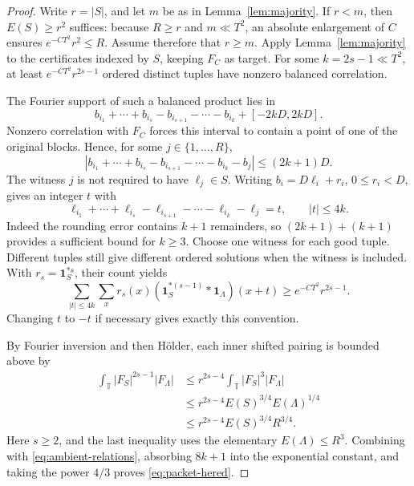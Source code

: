 \documentclass[11pt,reqno]{amsart}
\numberwithin{equation}{section}
\theoremstyle{definition}
\theoremstyle{remark}
\newcommand{\T}{\mathbb T}
\newcommand{\one}{\mathbf 1}
\begin{document}
\begin{proof}
Write $r=|S|$, and let $m$ be as in Lemma~\ref{lem:majority}. If $r<m$,
then $E(S)\ge r^2$ suffices: because $R\ge r$ and $m\ll T^2$, an
absolute enlargement of $C$ ensures $e^{-CT^2}r^2\le R$.
Assume therefore that $r\ge m$. Apply Lemma~\ref{lem:majority} to the
certificates indexed by $S$, keeping $F_C$ as target. For some
$k=2s-1\ll T^2$, at least $e^{-CT^2}r^{2s-1}$ ordered distinct tuples
have nonzero balanced correlation.

The Fourier support of such a balanced product lies in
\[
 b_{i_1}+\cdots+b_{i_s}-b_{i_{s+1}}-\cdots-b_{i_k}
                    +[-2kD,2kD].
\]
Nonzero correlation with $F_C$ forces this interval to contain a point
of one of the original blocks. Hence, for some $j\in\{1,\ldots,R\}$,
\[
 |b_{i_1}+\cdots+b_{i_s}-b_{i_{s+1}}-\cdots-b_{i_k}-b_j|
 \le(2k+1)D.
\]
The witness $j$ is not required to have $\ell_j\in S$. Writing
$b_i=D\ell_i+r_i$, $0\le r_i<D$, gives an integer $t$ with
\begin{equation}\label{eq:carry-relation}
 \ell_{i_1}+\cdots+\ell_{i_s}
 -\ell_{i_{s+1}}-\cdots-\ell_{i_k}-\ell_j=t,
 \qquad |t|\le4k.
\end{equation}
Indeed the rounding error contains $k+1$ remainders, so $(2k+1)+(k+1)$
provides a sufficient bound for $k\ge3$. Choose one witness for each
good tuple. Different tuples still give different ordered solutions
when the witness is included. With $r_s=\one_S^{*s}$, their count yields
\begin{equation}\label{eq:ambient-relations}
 \sum_{|t|\le4k}\sum_x r_s(x)
           (\one_S^{*(s-1)}*\one_\Lambda)(x+t)
 \ge e^{-CT^2}r^{2s-1}.
\end{equation}
Changing $t$ to $-t$ if necessary gives exactly this convention.

By Fourier inversion and then H\"older, each inner shifted pairing is
bounded above by
\begin{align*}
 \int_\T|F_S|^{2s-1}|F_\Lambda|
 &\le r^{2s-4}\int_\T|F_S|^3|F_\Lambda|\\
 &\le r^{2s-4}E(S)^{3/4}E(\Lambda)^{1/4}\\
 &\le r^{2s-4}E(S)^{3/4}R^{3/4}.
\end{align*}
Here $s\ge2$, and the last inequality uses the elementary
$E(\Lambda)\le R^3$. Combining with \eqref{eq:ambient-relations},
absorbing $8k+1$ into the exponential constant, and taking the power
$4/3$ proves \eqref{eq:packet-hered}.
\end{proof}
\end{document}
